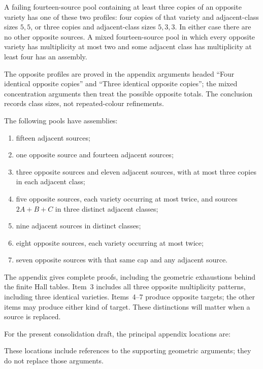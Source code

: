 \begin{lemma}[Concentration]\label{lem:elementary-concentration}
A failing fourteen-source pool containing at least three copies of an
opposite variety has one of these two profiles: four copies of that variety
and adjacent-class sizes $5,5$, or three copies and adjacent-class sizes
$5,3,3$. In either case there are no other opposite sources.
A mixed fourteen-source pool in which every opposite variety has
multiplicity at most two and some adjacent class has multiplicity at least
four has an assembly.
\end{lemma}
The opposite profiles are proved in the appendix arguments headed
``Four identical opposite copies'' and ``Three identical opposite copies'';
the mixed concentration arguments then treat the possible opposite totals.
The conclusion records class sizes, not repeated-colour refinements.

\begin{lemma}\label{lem:elementary-inputs}
The following pools have assemblies:
\begin{enumerate}
\item fifteen adjacent sources;
\item one opposite source and fourteen adjacent sources;
\item three opposite sources and eleven adjacent sources, with at most
three copies in each adjacent class;
\item five opposite sources, each variety occurring at most twice,
and sources $2A+B+C$ in three distinct adjacent classes;
\item nine adjacent sources in distinct classes;
\item eight opposite sources, each variety occurring at most twice;
\item seven opposite sources with that same cap and any adjacent source.
\end{enumerate}
\end{lemma}
The appendix gives complete proofs, including the geometric exhaustions
behind the finite Hall tables. Item~3 includes all three opposite
multiplicity patterns, including three identical varieties.
Items~4--7 produce opposite targets; the other items may produce either
kind of target. These distinctions will matter when a source is replaced.

For the present consolidation draft, the principal appendix locations are:


These locations include references to the supporting geometric arguments;
they do not replace those arguments.

